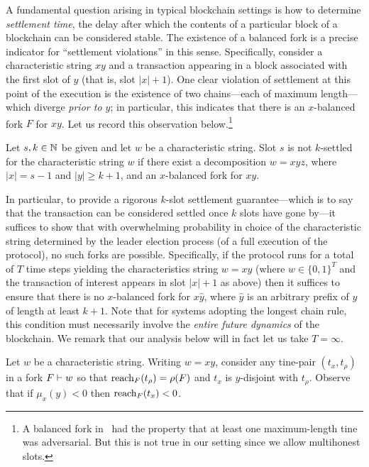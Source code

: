 A fundamental question arising in typical blockchain settings is how
to determine \emph{settlement time}, the delay after which the
contents of a particular block of a blockchain can be considered
stable. The existence of a balanced fork is a precise indicator for
``settlement violations'' in this sense. Specifically, consider a
characteristic string $xy$ and a transaction appearing in a block
associated with the first slot of $y$ (that is, slot $|x| + 1$). One
clear violation of settlement at this point of the execution is the
existence of two chains---each of maximum length---which diverge
\emph{prior to $y$}; in particular, this indicates that there is an
$x$-balanced fork $F$ for $xy$. Let us record this observation below.\footnote{
  A balanced fork in~\cite{LinearConsistency} 
  had the property that 
  at least one maximum-length tine was adversarial. 
  But this is not true in our setting since we allow multihonest slots.
}


\begin{observation}\label{obs:settlement-balanced-fork-mh}
  Let $s, k \in \mathbb{N}$ be given and 
  let $w$ be a characteristic string. 
  Slot $s$ is not $k$-settled for the characteristic string $w$ 
  if 
  there exist a decomposition $w = xyz$, 
  where $|x| = s - 1$ and $|y| \geq k+1$, 
  and an $x$-balanced fork for $xy$. 
\end{observation}

In particular, to provide a rigorous $k$-slot settlement
guarantee---which is to say that the transaction can be considered
settled once $k$ slots have gone by---it suffices to show that with
overwhelming probability in choice of the characteristic string
determined by the leader election process (of a full execution of the
protocol), no such forks are possible. Specifically, if the protocol
runs for a total of $T$ time steps yielding the characteristics string
$w = xy$ (where $w \in \{0,1\}^T$ and the transaction of interest
appears in slot $|x| + 1$ as above) then it suffices to ensure that
there is no $x$-balanced fork for $x\hat{y}$, where $\hat{y}$ is an
arbitrary prefix of $y$ of length at least $k + 1$. 
Note that
for systems adopting the longest chain rule, this condition must
necessarily involve the \emph{entire future dynamics} of the
blockchain. We remark that our analysis below will in fact let us take
$T = \infty$.


Let $w$ be a characteristic string. 
Writing $w = xy$, 
consider any tine-pair $(t_x, t_\rho)$ in a fork $F \vdash w$ so that 
$\operatorname{reach}_F(t_\rho) = \rho(F)$ and $t_x$ is $y$-disjoint with $t_\rho$.
Observe that if $\mu_x(y) < 0$ then $\operatorname{reach}_F(t_x) < 0$. 

